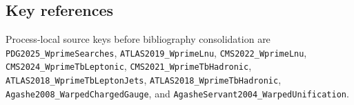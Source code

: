 \subsection*{Key references}
Process-local source keys before bibliography consolidation are
\texttt{PDG2025\_WprimeSearches},
\texttt{ATLAS2019\_WprimeLnu},
\texttt{CMS2022\_WprimeLnu},
\texttt{CMS2024\_WprimeTbLeptonic},
\texttt{CMS2021\_WprimeTbHadronic},
\texttt{ATLAS2018\_WprimeTbLeptonJets},
\texttt{ATLAS2018\_WprimeTbHadronic},
\texttt{Agashe2008\_WarpedChargedGauge}, and
\texttt{AgasheServant2004\_WarpedUnification}.
